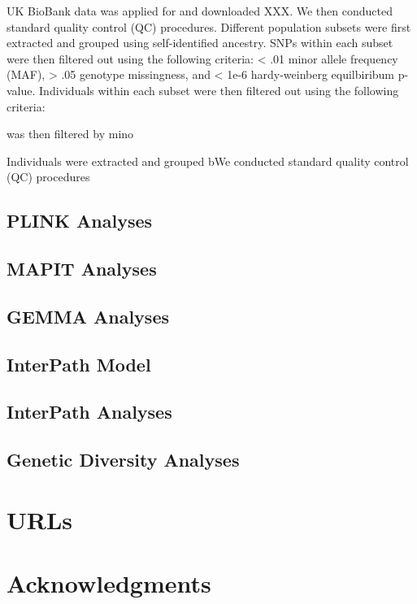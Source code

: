 \documentclass[12pt, a4paper]{article}
\begin{document}
UK BioBank data was applied for and downloaded XXX. We then conducted standard quality control (QC) procedures. Different population subsets were first extracted and grouped using self-identified ancestry. SNPs within each subset were then filtered out using the following criteria: < .01 minor allele frequency (MAF), > .05 genotype missingness, and < 1e-6 hardy-weinberg equilbiribum p-value. Individuals within each subset were then filtered out using the following criteria: 

was then filtered by mino 

Individuals were extracted and grouped bWe conducted standard quality control (QC) procedures

\subsection{PLINK Analyses}

\subsection{MAPIT Analyses}

\subsection{GEMMA Analyses}

\subsection{InterPath Model}

\subsection{InterPath Analyses}

\subsection{Genetic Diversity Analyses}

\section{URLs}\label{InterPath-URLs}

\section{Acknowledgments}\label{InterPath-Acknowledgments}
\end{document}
